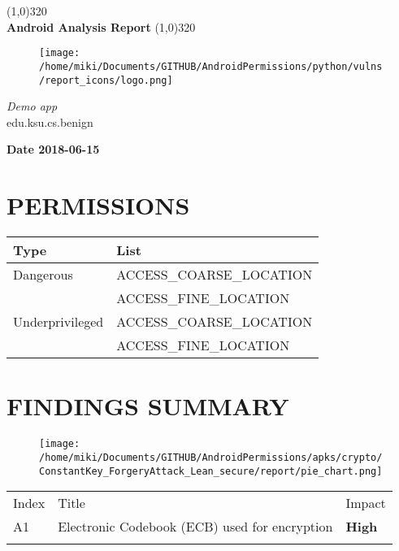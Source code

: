 \documentclass[12p]{article}
\begin{document}
\begin{titlepage}
\begin{center}
\line(1,0){320}\\
[0.25in]
\huge{\bfseries Android Analysis Report}
\line(1,0){320}\\
[0.5in]
\begin{figure}[H]
	\centering
	\texttt{[image: /home/miki/Documents/GITHUB/AndroidPermissions/python/vulns/report\_icons/logo.png]}
\end{figure}
\textsl{\LARGE Demo app}\\
\textsf{\LARGE edu.ksu.cs.benign}\\
[2.5in]
\end{center}
\begin{flushright}
\textbf{\large Date 2018-06-15}
\end{flushright}
\end{titlepage}
\tableofcontents
\thispagestyle{empty}
\cleardoublepage
\setcounter{page}{1}
\section{PERMISSIONS}
	\begin{longtable}{p{3cm} p{10cm} }
	\rowcolor{grannysmithapple!70} Type & List \\
\hline
Dangerous &  ACCESS\_COARSE\_LOCATION \\ 
 &  ACCESS\_FINE\_LOCATION \\ 
\hline
\hline
Underprivileged &  ACCESS\_COARSE\_LOCATION \\ 
 &  ACCESS\_FINE\_LOCATION \\ 
\hline
\hline
	\end{longtable}
\cleardoublepage
\newpage
\section{FINDINGS SUMMARY}\label{sec:summary}
\begin{figure}[H]
\centering
	\texttt{[image: /home/miki/Documents/GITHUB/AndroidPermissions/apks/crypto/ConstantKey\_ForgeryAttack\_Lean\_secure/report/pie\_chart.png]}
\end{figure}
	\begin{longtable}{p{0.5cm} p{10cm} p{1.5cm}}
	\rowcolor{grannysmithapple!70} Index & Title & Impact \\
	A1&Electronic Codebook \newline (ECB) used for encryption& \color{ferrarired}\textbf{High} \\
\hline\\	\end{longtable}
\cleardoublepage
\newpage
\end{document}

